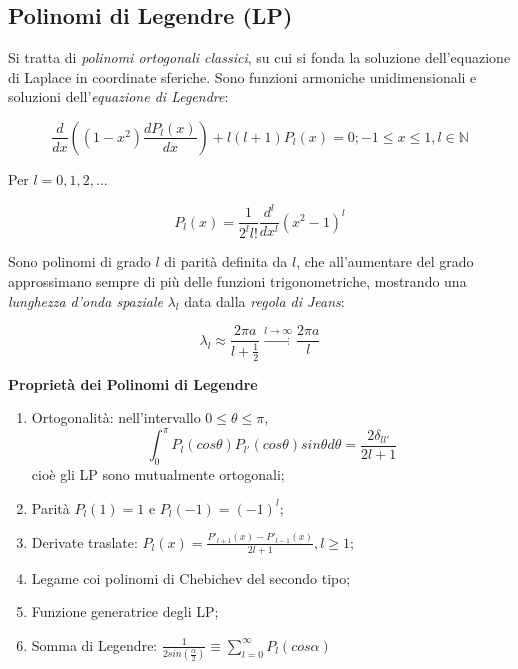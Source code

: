 \documentclass[a4paper,12pt]{book}
\begin{document}
\subsection{\textcolor{colore7}{Polinomi di Legendre (LP)}}

Si tratta di \textit{polinomi ortogonali classici}, su cui si fonda la soluzione dell'equazione di Laplace in coordinate sferiche.
Sono funzioni armoniche unidimensionali e soluzioni dell'\textit{equazione di Legendre}:

\begin{equation}
    \frac{d}{dx} \left( (1 - x^2) \frac{dP_l(x)}{dx} \right) + l(l+1) P_l(x) = 0; -1 \le x \le 1 , l \in \mathbb{N}
    \label{eq:Legendre}
\end{equation}

\noindent
Per $l = 0, 1, 2, \dots$

\begin{equation}
    P_l (x) = \frac{1}{2^l l!} \frac{d^l}{dx^l} (x^2 - 1)^l
\end{equation}

\noindent Sono polinomi di grado $l$ di parità definita da $l$, che all'aumentare del grado approssimano sempre di più delle funzioni trigonometriche, mostrando una \textit{lunghezza d'onda spaziale} $\lambda_l$ data dalla \textit{regola di Jeans}:

\begin{equation}
    \lambda_l \approx \frac{2 \pi a}{l + \frac{1}{2}} \xrightarrow{l \longrightarrow \infty} \frac{2 \pi a}{l}
    \label{eq:Jeans}
\end{equation}

\noindent
\textbf{Proprietà dei Polinomi di Legendre}

\begin{enumerate}
    \item Ortogonalità: nell'intervallo $0 \le \theta \le \pi$,
    \begin{equation}
        \int_0^\pi P_l(cos\theta) P_{l'} (cos\theta) sin\theta d\theta = \frac{2 \delta_{ll'}}{2l + 1}
    \end{equation}
    cioè gli LP sono mutualmente ortogonali;
    \item Parità $P_l (1) = 1$ e $P_l (-1) = (-1)^l$;
    \item Derivate traslate: $P_l (x) = \frac{P'_{l+1}(x) - P'_{l-1}(x)}{2l+1}, l \ge 1$;
    \item Legame coi polinomi di Chebichev del secondo tipo;
    \item Funzione generatrice degli LP;
    \item Somma di Legendre: $\frac{1}{2 sin \left(\frac{\alpha}{2} \right)} \equiv \sum_{l=0}^\infty P_l (cos \alpha)$
\end{enumerate}
\end{document}
